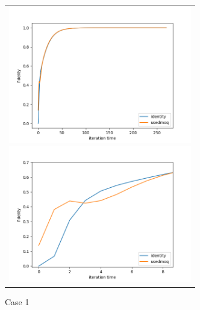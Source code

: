 \documentclass[11pt,a4j,notitlepage]{jreport}
\begin{document}
	\begin{figure}[htbp]
		\centering
			\begin{tabular}{c}
	  
				\begin{minipage}{0.5\hsize}
				\begin{center}
					\includegraphics[clip, width=8cm]{./picture/fp1111ed.png}
				\end{center}
				\end{minipage}
	  
				\begin{minipage}{0.5\hsize}
				\begin{center}
					\includegraphics[clip, width=8cm]{./picture/fp1111edextended.png}
				\end{center}
				\end{minipage}
			
			\end{tabular}
		\caption{Case 1}
	\end{figure}
\end{document}
